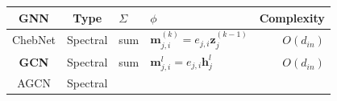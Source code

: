 \begin{table}
    \centering
    \begin{footnotesize}
        \begin{tabular}{ccp{8em}p{22em}r}
            \toprule
            GNN                                                                                                                       &
            Type                                                                                                                      &
            $\Sigma$                                                                                                                  &
            $\phi$                                                                                                                    &
            Complexity                                                                                                                  \\ \midrule
            ChebNet \cite{defferrad2016_chebnet}                                                                                      &
            Spectral                                                                                                                  &
            sum                                                                                                                       &
            $\boldsymbol{m}_{j, i}^{(k)} = e_{j, i}\boldsymbol{z}_j^{(k-1)}$                                                          &
            $O(d_{in})$                                                                                                                 \\
            \textbf{GCN} \cite{kipf2017_gcn}                                                                                          &
            Spectral                                                                                                                  &
            sum                                                                                                                       &
            $\boldsymbol{m}_{j, i}^l = e_{j, i} \boldsymbol{h}_j^l$                                                                   &
            $O(d_{in})$                                                                                                                 \\
            AGCN \cite{li2018_agcn}                                                                                                   &
            Spectral                                                                                                                  &

\end{tabular}
\end{footnotesize}
\end{table}
